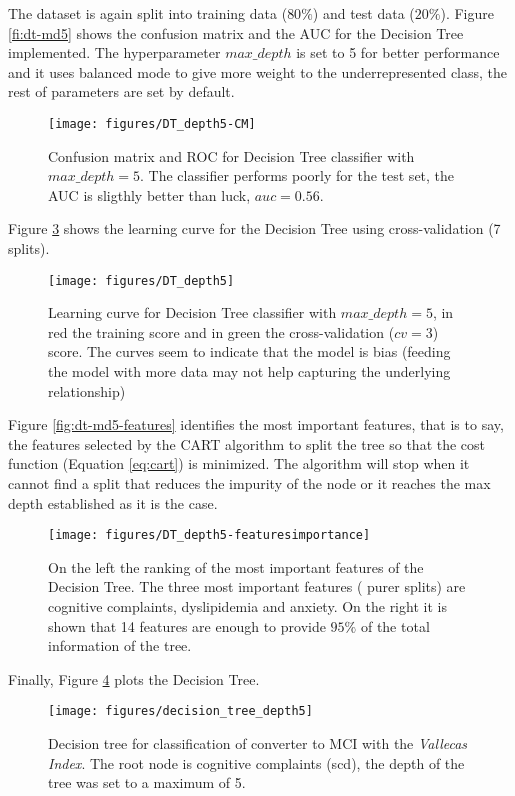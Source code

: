 \documentclass[11pt]{article}
\begin{document}
The dataset is again split into training data ($80\%$) and test data ($20\%$). Figure \ref{fi:dt-md5} shows the confusion matrix and the AUC for the Decision Tree implemented. The hyperparameter $max\_depth$ is set to 5 for better performance and it uses balanced mode to give more weight to the underrepresented class, the rest of parameters are set by default.
\begin{figure}[H]
        \centering
        \texttt{[image: figures/DT\_depth5-CM]}
        \caption{Confusion matrix and ROC for Decision Tree classifier with $max\_depth=5$. The classifier performs poorly for the test set, the AUC is sligthly better than luck, $auc=0.56$.
        }
\label{fig:dt-md5}
\end{figure}

Figure \ref{fig:dt-md5-learning} shows the learning curve for the Decision Tree using cross-validation (7 splits). 
\begin{figure}[H]
        \centering
        \texttt{[image: figures/DT\_depth5]}
        \caption{Learning curve for Decision Tree classifier with $max\_depth=5$, in red the training score and in green the cross-validation ($cv=3$) score. The curves seem to indicate that the model is bias (feeding the model with more data may not help capturing the underlying relationship)
        }
\label{fig:dt-md5-learning}
\end{figure}

Figure \ref{fig:dt-md5-features} identifies the most important features, that is to say, the features selected by the CART algorithm to split the tree so that the cost function (Equation \ref{eq:cart}) is minimized. The algorithm will stop when it cannot find a split that reduces the impurity of the node or it reaches the max depth established as it is the case.
\begin{figure}[H]
        \centering
        \texttt{[image: figures/DT\_depth5-featuresimportance]}
        \caption{On the left the ranking of the most important features of the Decision Tree. The three most important features ( purer splits) are cognitive complaints, dyslipidemia and anxiety. On the right it is shown that 14 features are enough to provide $95\%$ of the total information of the tree.   
        }
\label{fig:dt-md5-learning}
\end{figure}

Finally, Figure \ref{fig:dt-md5-dot} plots the Decision Tree. 
\begin{figure}[H]
        \centering
        \texttt{[image: figures/decision\_tree\_depth5]}
        \caption{Decision tree for classification of converter to MCI with the \emph{Vallecas Index}. The root node is cognitive complaints (scd), the depth of the tree was set to a maximum of 5.
        }
\label{fig:dt-md5-dot}
\end{figure}
\end{document}
